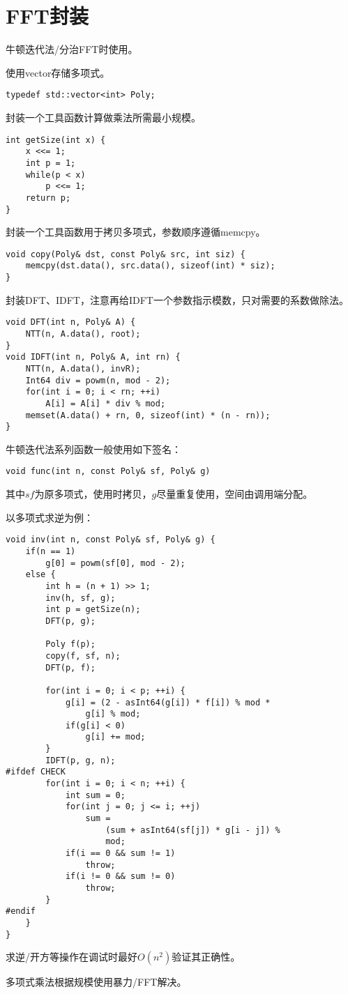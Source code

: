 \section{FFT封装}
牛顿迭代法/分治FFT时使用。

使用vector存储多项式。
\begin{lstlisting}
typedef std::vector<int> Poly;
\end{lstlisting}

封装一个工具函数计算做乘法所需最小规模。
\begin{lstlisting}
int getSize(int x) {
    x <<= 1;
    int p = 1;
    while(p < x)
        p <<= 1;
    return p;
}
\end{lstlisting}

封装一个工具函数用于拷贝多项式，参数顺序遵循memcpy。
\begin{lstlisting}
void copy(Poly& dst, const Poly& src, int siz) {
    memcpy(dst.data(), src.data(), sizeof(int) * siz);
}
\end{lstlisting}

封装DFT、IDFT，注意再给IDFT一个参数指示模数，只对需要的系数做除法。
\begin{lstlisting}
void DFT(int n, Poly& A) {
    NTT(n, A.data(), root);
}
void IDFT(int n, Poly& A, int rn) {
    NTT(n, A.data(), invR);
    Int64 div = powm(n, mod - 2);
    for(int i = 0; i < rn; ++i)
        A[i] = A[i] * div % mod;
    memset(A.data() + rn, 0, sizeof(int) * (n - rn));
}
\end{lstlisting}

牛顿迭代法系列函数一般使用如下签名：
\begin{lstlisting}
void func(int n, const Poly& sf, Poly& g)
\end{lstlisting}
其中$sf$为原多项式，使用时拷贝，$g$尽量重复使用，空间由调用端分配。

以多项式求逆为例：
\begin{lstlisting}
void inv(int n, const Poly& sf, Poly& g) {
    if(n == 1)
        g[0] = powm(sf[0], mod - 2);
    else {
        int h = (n + 1) >> 1;
        inv(h, sf, g);
        int p = getSize(n);
        DFT(p, g);

        Poly f(p);
        copy(f, sf, n);
        DFT(p, f);

        for(int i = 0; i < p; ++i) {
            g[i] = (2 - asInt64(g[i]) * f[i]) % mod *
                g[i] % mod;
            if(g[i] < 0)
                g[i] += mod;
        }
        IDFT(p, g, n);
#ifdef CHECK
        for(int i = 0; i < n; ++i) {
            int sum = 0;
            for(int j = 0; j <= i; ++j)
                sum =
                    (sum + asInt64(sf[j]) * g[i - j]) %
                    mod;
            if(i == 0 && sum != 1)
                throw;
            if(i != 0 && sum != 0)
                throw;
        }
#endif
    }
}
\end{lstlisting}

求逆/开方等操作在调试时最好$O(n^2)$验证其正确性。

多项式乘法根据规模使用暴力/FFT解决。
